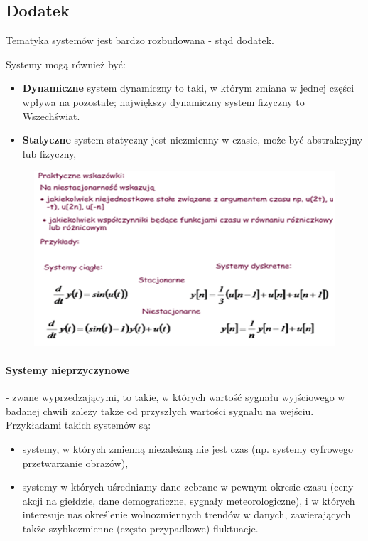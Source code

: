 \documentclass[a4paper,twoside]{report}
\begin{document}
\subsection{Dodatek}
Tematyka systemów jest bardzo rozbudowana - stąd dodatek.

Systemy mogą również być:
\begin{itemize}
\item \textbf{Dynamiczne}
system dynamiczny to taki, w którym zmiana w jednej części wpływa na pozostałe; największy dynamiczny system fizyczny to Wszechświat.
\item \textbf{Statyczne}
system statyczny jest niezmienny w czasie, może być abstrakcyjny lub fizyczny,
\end{itemize}


\begin{figure}[htbp]
\centering
\includegraphics[scale=0.8]{obrazy/slajd.png}
\end{figure}

\paragraph{Systemy nieprzyczynowe} - zwane wyprzedzającymi, to takie, w których wartość sygnału wyjściowego w badanej chwili zależy także od przyszłych wartości sygnału na wejściu. Przykładami takich systemów są:
\begin{itemize}
\item systemy, w których zmienną niezależną nie jest czas (np. systemy cyfrowego przetwarzanie obrazów),
\item systemy w których uśredniamy dane zebrane w pewnym okresie czasu (ceny akcji na giełdzie, dane demograficzne, sygnały meteorologiczne), i w których interesuje nas określenie wolnozmiennych trendów w danych, zawierających także szybkozmienne (często przypadkowe) fluktuacje.
\end{itemize}
\end{document}
